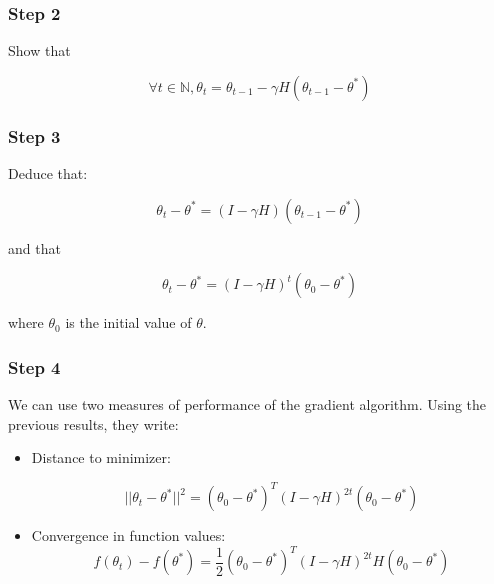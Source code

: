 \documentclass[
10pt, %
a4paper, %
oneside, %
headinclude,footinclude, %
BCOR5mm, %
]{scrartcl}
\begin{document}
    \subsubsection{Step 2}%
    \label{ssub:Step 2}

    Show that

    \begin{equation}
\forall t\in \mathbb{N},	\theta_t  = \theta_{t-1}-\gamma H(\theta_{t-1}-\theta^*)
    \end{equation}

    \subsubsection{Step 3}%
    \label{ssub:Step 3}
    


    Deduce that:

    \begin{equation}
	\theta_t-\theta^* = (I-\gamma H)(\theta_{t-1}-\theta^*)
    \end{equation}

    and that

    \begin{equation}
	\theta_t-\theta^* = (I-\gamma H)^t(\theta_{0}-\theta^*)
    \end{equation}

    where $\theta_0$ is the initial value of $\theta$.


    \subsubsection{Step 4}%
    \label{ssub:Step 4}
    
    
    We can use two measures of performance of the gradient algorithm. Using the
    previous results, they write:

    \begin{itemize}
        \item Distance to minimizer:

	    \begin{equation}
		||\theta_t-\theta^*||^2 = (\theta_0-\theta^*)^T(I-\gamma H)^{2t}(\theta_{0}-\theta^*)
	    \end{equation}
	\item Convergence in function values:
	    \begin{equation}
		f(\theta_t)-f(\theta^*) = \frac{1}{2} (\theta_0-\theta^*)^T(I-\gamma H)^{2t}H(\theta_{0}-\theta^*)
	    \end{equation}

    \end{itemize}
    
\end{document}
